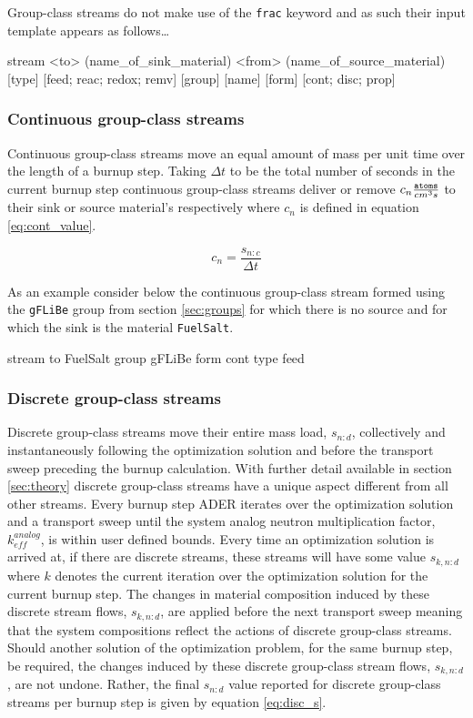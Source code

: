 Group-class streams do not make use of the \texttt{frac} keyword and as such
their input template appears as follows\ldots

\begin{lt}
stream <to> (name_of_sink_material) <from> (name_of_source_material)
    [type] [{feed; reac; redox; remv}] [group] [name] 
    [form] [{cont; disc; prop}] 
\end{lt}

\subsubsection{Continuous group-class streams}\label{sssec:cgroup}
Continuous group-class streams move an equal amount of mass per unit time over
the length of a burnup step. Taking $\Delta t$ to be the total number of seconds
in the current burnup step continuous group-class streams deliver or remove 
$c_{n} \frac{\text{\texttt{atoms}}}{cm^{3}s}$ to their sink or source material's
respectively where $c_{n}$ is defined in equation \ref{eq:cont_value}.

\begin{equation}\label{eq:cont_value}
c_{n} = \frac{s_{n:c}}{\Delta t}
\end{equation} 

As an example consider below the continuous group-class stream formed using
the \texttt{gFLiBe} group from section \ref{sec:groups} for which there is
no source and for which the sink is the material \texttt{FuelSalt}.

\begin{li}
stream to FuelSalt group gFLiBe form cont type feed 
\end{li}

\subsubsection{Discrete group-class streams}\label{sssec:dgroup}
Discrete group-class streams move their entire mass load, $s_{n:d}$, 
collectively
and instantaneously following the optimization solution and before the 
transport sweep preceding the burnup calculation. With further detail
available in section \ref{sec:theory} discrete group-class streams have a 
unique aspect different from all other streams. Every burnup step ADER
iterates over the optimization solution and a transport sweep until 
the system analog neutron multiplication factor, $k_{eff}^{analog}$, is within
user defined bounds. Every time an optimization solution is arrived at, if
there are discrete streams, these streams will have some value $s_{k,n:d}$ 
where
$k$ denotes the current iteration over the optimization solution for the current
burnup step. The changes in material composition induced by these discrete
stream flows, $s_{k,n:d}$, are applied before the next transport sweep meaning
that the system compositions reflect the actions of discrete group-class
streams. Should another solution of the optimization problem, for the same 
burnup step, be required, the changes induced by these discrete group-class
stream flows, $s_{k,n:d}$, are not undone. Rather, the final $s_{n:d}$ value
reported for discrete group-class streams per burnup step is given by
equation \ref{eq:disc_s}.

